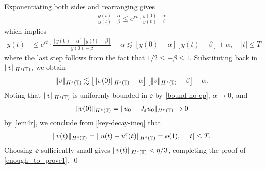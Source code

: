 %
%
Exponentiating both sides and rearranging gives
%
%
\begin{equation*}
	\begin{split}
		\frac{y(t) - \alpha}{y(t) - \beta} \le e^{ct} \cdot
		\frac{y(0) - \alpha}{y(0) - \beta}	
	\end{split}
\end{equation*}
%
%
which implies
%
%
\begin{equation*}
	\begin{split}
		y(t) 
		& \le e^{ct} \cdot \frac{\left [y(0) - \alpha \right ]
		\left [y(t) - \beta \right ]}{y(0) - 
		\beta} + \alpha
		 \lesssim \left [y(0) - \alpha \right ] \left [y(t) - \beta \right ] + \alpha, \quad |t| \le T
	\end{split}
\end{equation*}
%
%
where the last step follows from the fact that $1/2 \le -\beta \le 1$.  Substituting back in $\|v\|_{H^s(\mathbb{T})}$, we obtain
\begin{equation}
	\label{key-decay-ineq}
	\begin{split}
		\|v\|_{H^s(\mathbb{T})}  \lesssim \left [\|v(0)\|_{H^s(\mathbb{T})} - 
		\alpha \right ] \left [\|v\|_{H^s(\mathbb{T})} - \beta \right ] + \alpha.
	\end{split}
\end{equation}
Noting that $\|v\|_{H^s(\mathbb{T})}$ is uniformly bounded in $\ee$ by 
\eqref{bound-no-ep}, $\alpha \to 0$, and
%
%
\begin{equation*}
\label{303''qx}
\begin{split}
\|v(0)\|_{H^s(\mathbb{T})} = \|u_0 - J_\varepsilon u_0 \|_{H^s(\mathbb{T})} \to 0 \end{split}
\end{equation*}
by  \cref{lem4r}, we conclude from \eqref{key-decay-ineq} that
%
%
\begin{equation}
\label{304qx}
\begin{split}
\|v(t)\|_{H^s(\mathbb{T})} = 
\|u(t) - u^\varepsilon(t) \|_{H^s(\mathbb{T})}= o(1), \quad |t| \le T.
\end{split}
\end{equation}
%
%
Choosing $\ee$ sufficiently small gives $\|v(t)\|_{H^s(\mathbb{T})} < \eta/3$, 
completing the proof of \eqref{enough_to_prove1}. \qed
%
%
%
%
%
%
